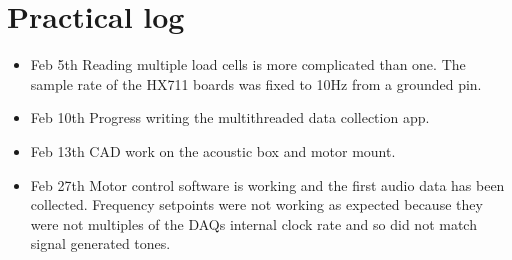 \documentclass{article}
\begin{document}
\section{Practical log}

\begin{itemize}
    \item Feb 5th Reading multiple load cells is more complicated than one. The sample rate of the HX711 boards was fixed to 10Hz from a grounded pin.
    \item Feb 10th Progress writing the multithreaded data collection app.
    \item Feb 13th CAD work on the acoustic box and motor mount.
    \item Feb 27th Motor control software is working and the first audio data has been collected. Frequency setpoints were not working as expected because they were not multiples of the DAQs internal clock rate and so did not match signal generated tones.

\end{itemize}
\end{document}
